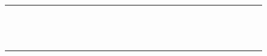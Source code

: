 \documentclass[10pt]{article}
\begin{document}
\begin{center}
\begin{tabular}{|c|c|c|c|c|c|c|c|c|c|c|c|c|c|c|c|c|c|c|c|c|c|c|c|c|c|c|c|c|c|}
\hline
 &  &  &  &  &  &  &  &  &  &  &  &  &  &  &  &  &  &  &  &  &  &  &  &  &  &  &  &  &  \\
\hline
 &  &  &  &  &  &  &  &  &  &  &  &  &  &  &  &  &  &  &  &  &  &  &  &  &  &  &  &  &  \\
\hline
 &  &  &  &  &  &  &  &  &  &  &  &  &  &  &  &  &  &  &  &  &  &  &  &  &  &  &  &  &  \\
\hline
 &  &  &  &  &  &  &  &  &  &  &  &  &  &  &  &  &  &  &  &  &  &  &  &  &  &  &  &  &  \\
\hline
 &  &  &  &  &  &  &  &  &  &  &  &  &  &  &  &  &  &  &  &  &  &  &  &  &  &  &  &  &  \\
\hline
 &  &  &  &  &  &  &  &  &  &  &  &  &  &  &  &  &  &  &  &  &  &  &  &  &  &  &  &  &  \\
\hline
 &  &  &  &  &  &  &  &  &  &  &  &  &  &  &  &  &  &  &  &  &  &  &  &  &  &  &  &  &  \\
\hline
 &  &  &  &  &  &  &  &  &  &  &  &  &  &  &  &  &  &  &  &  &  &  &  &  &  &  &  &  &  \\
\hline
 &  &  &  &  &  &  &  &  &  &  &  &  &  &  &  &  &  &  &  &  &  &  &  &  &  &  &  &  &  \\
\hline
 &  &  &  &  &  &  &  &  &  &  &  &  &  &  &  &  &  &  &  &  &  &  &  &  &  &  &  &  &  \\
\hline
 &  &  &  &  &  &  &  &  &  &  &  &  &  &  &  &  &  &  &  &  &  &  &  &  &  &  &  &  &  \\
\hline
 &  &  &  &  &  &  &  &  &  &  &  &  &  &  &  &  &  &  &  &  &  &  &  &  &  &  &  &  &  \\
\hline
 &  &  &  &  &  &  &  &  &  &  &  &  &  &  &  &  &  &  &  &  &  &  &  &  &  &  &  &  &  \\
\hline
 &  &  &  &  &  &  &  &  &  &  &  &  &  &  &  &  &  &  &  &  &  &  &  &  &  &  &  &  &  \\
\hline
 &  &  &  &  &  &  &  &  &  &  &  &  &  &  &  &  &  &  &  &  &  &  &  &  &  &  &  &  &  \\
\hline
\end{tabular}
\end{center}
\end{document}
